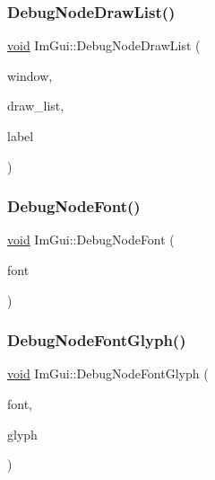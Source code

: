 \subsubsection{\texorpdfstring{Debug\+Node\+Draw\+List()}{DebugNodeDrawList()}}
{\footnotesize\ttfamily \hyperlink{imgui__impl__opengl3__loader_8h_ac668e7cffd9e2e9cfee428b9b2f34fa7}{void} Im\+Gui\+::\+Debug\+Node\+Draw\+List (\begin{DoxyParamCaption}\item[{\hyperlink{structImGuiWindow}{Im\+Gui\+Window} $\ast$}]{window,  }\item[{const \hyperlink{structImDrawList}{Im\+Draw\+List} $\ast$}]{draw\+\_\+list,  }\item[{const char $\ast$}]{label }\end{DoxyParamCaption})}

\mbox{\label{namespaceImGui_ae0207d60728f7e6a47dbcd1d7d84e3cb}} 
\subsubsection{\texorpdfstring{Debug\+Node\+Font()}{DebugNodeFont()}}
{\footnotesize\ttfamily \hyperlink{imgui__impl__opengl3__loader_8h_ac668e7cffd9e2e9cfee428b9b2f34fa7}{void} Im\+Gui\+::\+Debug\+Node\+Font (\begin{DoxyParamCaption}\item[{\hyperlink{structImFont}{Im\+Font} $\ast$}]{font }\end{DoxyParamCaption})}

\mbox{\label{namespaceImGui_ad57d7756b61feecb86a3f25dc2a526f3}} 
\subsubsection{\texorpdfstring{Debug\+Node\+Font\+Glyph()}{DebugNodeFontGlyph()}}
{\footnotesize\ttfamily \hyperlink{imgui__impl__opengl3__loader_8h_ac668e7cffd9e2e9cfee428b9b2f34fa7}{void} Im\+Gui\+::\+Debug\+Node\+Font\+Glyph (\begin{DoxyParamCaption}\item[{\hyperlink{structImFont}{Im\+Font} $\ast$}]{font,  }\item[{const \hyperlink{structImFontGlyph}{Im\+Font\+Glyph} $\ast$}]{glyph }\end{DoxyParamCaption})}

